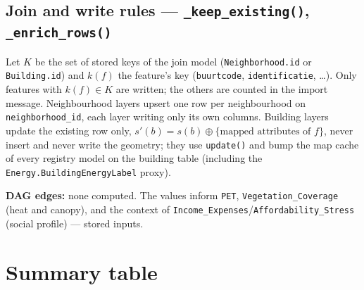 \documentclass[11pt]{article}
\newcommand{\code}[1]{\texttt{#1}}
\begin{document}
\subsection{Join and write rules --- \code{\_keep\_existing()}, \code{\_enrich\_rows()}}
Let $K$ be the set of stored keys of the join model (\code{Neighborhood.id} or \code{Building.id}) and $k(f)$ the feature's key (\code{buurtcode}, \code{identificatie}, \ldots). Only features with $k(f) \in K$ are written; the others are counted in the import message. Neighbourhood layers upsert one row per neighbourhood on \code{neighborhood\_id}, each layer writing only its own columns. Building layers update the existing row only, $s'(b) = s(b) \oplus \{\text{mapped attributes of } f\}$, never insert and never write the geometry; they use \code{update()} and bump the map cache of every registry model on the building table (including the \code{Energy.BuildingEnergyLabel} proxy).

\textbf{DAG edges:} none computed. The values inform \texttt{PET}, \texttt{Vegetation\_Coverage} (heat and canopy), and the context of \texttt{Income\_Expenses}/\texttt{Affordability\_Stress} (social profile) --- stored inputs.

\section{Summary table}
\end{document}
